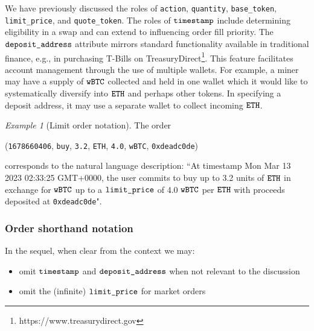 \documentclass[11pt, reqno]{amsart}
\theoremstyle{definition}
\theoremstyle{remark}
\newtheorem{exmp}{Example}[subsection]
\newcommand{\BTC}{\textnormal{\texttt{wBTC}}}
\newcommand{\ETH}{\textnormal{\texttt{ETH}}}
\newcommand{\timestamp}{\textnormal{\texttt{timestamp}}}
\newcommand{\action}{\textnormal{\texttt{action}}}
\newcommand{\quantity}{\textnormal{\texttt{quantity}}}
\newcommand{\basetoken}{\textnormal{\texttt{base\_token}}}
\newcommand{\limitprice}{\textnormal{\texttt{limit\_price}}}
\newcommand{\quotetoken}{\textnormal{\texttt{quote\_token}}}
\newcommand{\depositaddress}{\textnormal{\texttt{deposit\_address}}}
\newcommand{\buy}{\textnormal{\texttt{buy}}}
\begin{document}
We have previously discussed the roles of \action, \quantity, \basetoken,
\limitprice, and \quotetoken.
The roles of $\timestamp$ include determining eligibility in a swap and can
extend to influencing order fill priority.
The $\depositaddress$ attribute mirrors standard functionality
available in traditional finance, e.g., in purchasing T-Bills on
TreasuryDirect\footnote{https://www.treasurydirect.gov}. This feature
facilitates account management through the use of multiple wallets. For
example, a miner may have a supply of $\BTC$ collected and held in one wallet
which it would like to systematically diversify into $\ETH$ and perhaps other
tokens. In specifying a deposit address, it may use a separate wallet to collect
incoming $\ETH$.

\begin{exmp}[Limit order notation]
The order
\begin{center}
(\textnormal{\texttt{1678660406}},
\buy,
\textnormal{\texttt{3.2}},
\ETH,
\textnormal{\texttt{4.0}},
\BTC,
\textnormal{\texttt{0xdeadc0de}})
\end{center}
corresponds to the natural language description:
``At timestamp Mon Mar 13 2023 02:33:25 GMT+0000, the user commits to buy up to
3.2 units of $\ETH$ in exchange for $\BTC$ up to a $\limitprice$ of 4.0
$\BTC$ per $\ETH$ with proceeds deposited at \textnormal{\texttt{0xdeadc0de}}".
\end{exmp}

\subsubsection{Order shorthand notation}
In the sequel, when clear from the context we may:
\begin{itemize}
\item omit $\timestamp$ and $\depositaddress$ when not relevant to the
      discussion
\item omit the (infinite) $\limitprice$ for market orders
\end{itemize}
\end{document}

